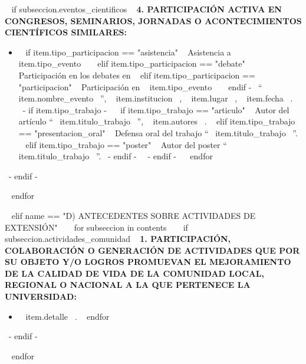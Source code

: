     ~{ if subseccion.eventos_cientificos }~
      \textbf{4. PARTICIPACIÓN ACTIVA EN CONGRESOS, SEMINARIOS, JORNADAS O ACONTECIMIENTOS CIENTÍFICOS SIMILARES:}
      \begin{itemize}
      ~{ for item in subseccion.eventos_cientificos }~
        \item ~{ if item.tipo_participacion == "asistencia" }~ Asistencia a ~{{ item.tipo_evento }}~  
              ~{ elif item.tipo_participacion == "debate" }~ Participación en los debates en
              ~{ elif item.tipo_participacion == "participacion" }~ Participación en ~{{ item.tipo_evento }}~ ~{ endif -}~
              ``~{{ item.nombre_evento }}~'', ~{{ item.institucion }}~, ~{{ item.lugar }}~, ~{{ item.fecha }}~.
              ~{- if item.tipo_trabajo -}~
                ~{ if item.tipo_trabajo == "articulo" }~ Autor del artículo ``~{{ item.titulo_trabajo }}~'', ~{{ item.autores }}~.
                ~{ elif item.tipo_trabajo == "presentacion_oral" }~ Defensa oral del trabajo ``~{{ item.titulo_trabajo }}~''.
                ~{ elif item.tipo_trabajo == "poster" }~ Autor del poster ``~{{ item.titulo_trabajo }}~''. ~{- endif -}~
              ~{- endif -}~
        \espacioEntreItems{}
      ~{ endfor }~
      \end{itemize}
      \espacioEntreSubSecciones{}
    ~{- endif -}~

  ~{ endfor }~
  \espacioEntreSecciones{}


~{ elif name == "D) ANTECEDENTES SOBRE ACTIVIDADES DE EXTENSIÓN" }~
  ~{ for subseccion in contents }~
    ~{ if subseccion.actividades_comunidad }~
      \textbf{1. PARTICIPACIÓN, COLABORACIÓN O GENERACIÓN DE ACTIVIDADES QUE POR SU OBJETO Y/O LOGROS PROMUEVAN EL MEJORAMIENTO DE LA CALIDAD DE VIDA DE LA  COMUNIDAD LOCAL, REGIONAL O NACIONAL A LA QUE PERTENECE LA UNIVERSIDAD:}
      \begin{itemize}
      ~{ for item in subseccion.actividades_comunidad }~
        \item ~{{ item.detalle }}~.
        \espacioEntreItems{}
      ~{ endfor }~
      \end{itemize}
      \espacioEntreSubSecciones{}
    ~{- endif -}~

  ~{ endfor }~
  \espacioEntreSecciones{}


